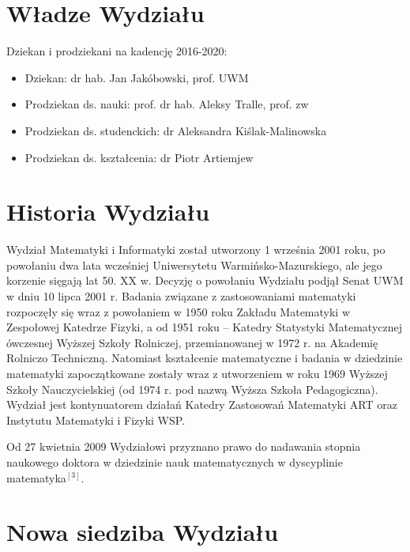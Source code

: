 \documentclass[a4paper,12pt]{article}
\begin{document}
\section{Władze Wydziału}
Dziekan i prodziekani na kadencję 2016-2020:

\begin{itemize}
\item Dziekan: dr hab. Jan Jakóbowski, prof. UWM
\item Prodziekan ds. nauki: prof. dr hab. Aleksy Tralle, prof. zw
\item Prodziekan ds. studenckich: dr Aleksandra Kiślak-Malinowska
\item Prodziekan ds. kształcenia: dr Piotr Artiemjew
\end{itemize}

\section{Historia Wydziału}
Wydział Matematyki i Informatyki został utworzony 1 września 2001 roku, po powołaniu dwa lata wcześniej
Uniwersytetu Warmińsko-Mazurskiego, ale jego korzenie sięgają lat 50. XX w. Decyzję o powołaniu Wydziału
podjął Senat UWM w dniu 10 lipca 2001 r. Badania związane z zastosowaniami matematyki rozpoczęły się
wraz z powołaniem w 1950 roku Zakładu Matematyki w Zespołowej Katedrze Fizyki, a od 1951 roku –
Katedry Statystyki Matematycznej ówczesnej Wyższej Szkoły Rolniczej, przemianowanej w 1972 r. na
Akademię Rolniczo Techniczną. Natomiast kształcenie matematyczne i badania w dziedzinie matematyki
zapoczątkowane zostały wraz z utworzeniem w roku 1969 Wyższej Szkoły Nauczycielskiej (od 1974 r. pod
nazwą Wyższa Szkoła Pedagogiczna). Wydział jest kontynuatorem działań Katedry Zastosowań Matematyki
ART oraz Instytutu Matematyki i Fizyki WSP.
 
Od 27 kwietnia 2009 Wydziałowi przyznano prawo do nadawania stopnia naukowego doktora w dziedzinie
nauk matematycznych w dyscyplinie matematyka$^{[3]}$.

\section{Nowa siedziba Wydziału}
\end{document}
